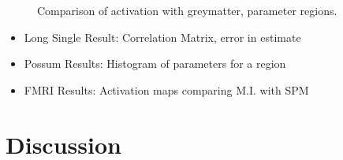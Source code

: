 \documentclass[journal]{./IEEEtran}
\begin{document}
\begin{figure}[!t]
\hfil
{}
\caption{Comparison of activation with greymatter, parameter regions.}
\label{fig:simslice_hm}
\end{figure}

\begin{itemize}
\item Long Single Result: Correlation Matrix, error in estimate
\item Possum Results: Histogram of parameters for a region
\item FMRI Results: Activation maps comparing M.I. with SPM
\end{itemize}

\section{Discussion}
\label{sec:Discussion}
\end{document}
